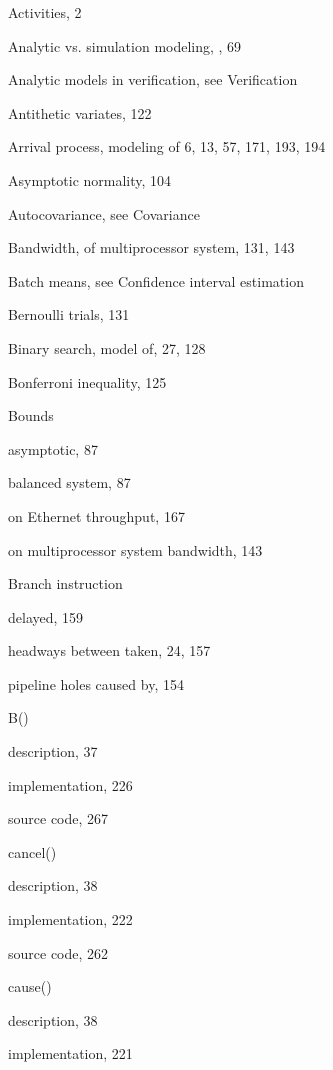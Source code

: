 \noindent Activities, 2\par
\noindent Analytic vs. simulation modeling, , 69\par
\noindent Analytic models in verification, see Verification\par
\noindent Antithetic variates, 122\par
\noindent Arrival process, modeling of 6, 13, 57, 171, 193, 194\par
\noindent Asymptotic normality, 104\par
\noindent Autocovariance, see Covariance\par
\noindent Bandwidth, of multiprocessor system, 131, 143\par
\noindent Batch means, see Confidence interval estimation\par
\noindent Bernoulli trials, 131\par
\noindent Binary search, model of, 27, 128\par
\noindent Bonferroni inequality, 125\par
\noindent Bounds\par
\quad asymptotic, 87\par
\quad balanced system, 87\par
\quad on Ethernet throughput, 167\par
\quad on multiprocessor system bandwidth, 143\par
\noindent Branch instruction\par
\quad delayed, 159\par
\quad headways between taken, 24, 157\par
\quad pipeline holes caused by, 154\par
\noindent B()\par
\quad description, 37\par
\quad implementation, 226\par
\quad source code, 267\par
\noindent cancel()\par
\quad description, 38\par
\quad implementation, 222\par
\quad source code, 262\par
\noindent cause()\par
\quad description, 38\par
\quad implementation, 221\par
